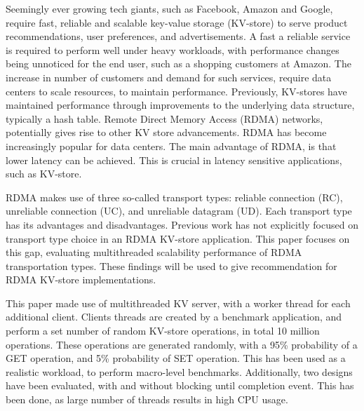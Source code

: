 


\begin{abstracts}        %

    Seemingly ever growing tech giants, such as Facebook, Amazon and Google, require fast, reliable and scalable key-value storage (KV-store) to serve product recommendations, user preferences, and advertisements.
    A fast a reliable service is required to perform well under heavy workloads, with performance changes being unnoticed for the end user, such as a shopping customers at Amazon.
    The increase in number of customers and demand for such services, require data centers to scale resources, to maintain performance.
    Previously, KV-stores have maintained performance through improvements to the underlying data structure, typically a hash table.
    Remote Direct Memory Access (RDMA) networks, potentially gives rise to other KV store advancements.
    RDMA has become increasingly popular for data centers.
    The main advantage of RDMA, is that lower latency can be achieved.
    This is crucial in latency sensitive applications, such as KV-store.

    RDMA makes use of three so-called transport types: reliable connection (RC), unreliable connection (UC), and unreliable datagram (UD).
    Each transport type has its advantages and disadvantages.
    Previous work has not explicitly focused on transport type choice in an RDMA KV-store application.
    This paper focuses on this gap, evaluating multithreaded scalability performance of RDMA transportation types.
    These findings will be used to give recommendation for RDMA KV-store implementations.

    This paper made use of multithreaded KV server, with a worker thread for each additional client.
    Clients threads are created by a benchmark application, and perform a set number of random KV-store operations, in total 10 million operations.
    These operations are generated randomly, with a 95\% probability of a GET operation, and 5\% probability of SET operation.
    This has been used as a realistic workload, to perform macro-level benchmarks.
    Additionally, two designs have been evaluated, with and without blocking until completion event.
    This has been done, as large number of threads results in high CPU usage.


\end{abstracts}
